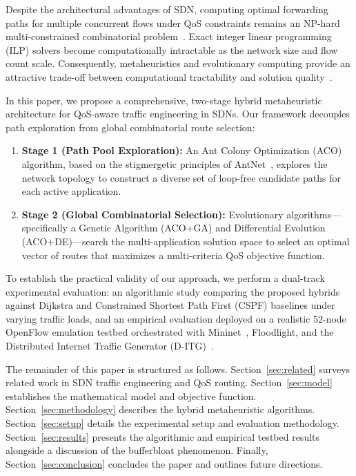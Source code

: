\documentclass[journal]{IEEEtran}
\begin{document}
Despite the architectural advantages of SDN, computing optimal forwarding paths for multiple concurrent flows under QoS constraints remains an NP-hard multi-constrained combinatorial problem~\cite{korkmaz2001multiconstrained, lin2022survey}. Exact integer linear programming (ILP) solvers become computationally intractable as the network size and flow count scale. Consequently, metaheuristics and evolutionary computing provide an attractive trade-off between computational tractability and solution quality~\cite{dorigo2004ant, goldberg1989genetic, storn1997differential, alsadi2021qos}.

In this paper, we propose a comprehensive, two-stage hybrid metaheuristic architecture for QoS-aware traffic engineering in SDNs. Our framework decouples path exploration from global combinatorial route selection:
\begin{enumerate}
    \item \textbf{Stage 1 (Path Pool Exploration):} An Ant Colony Optimization (ACO) algorithm, based on the stigmergetic principles of AntNet~\cite{dicaro1998antnet}, explores the network topology to construct a diverse set of loop-free candidate paths for each active application.
    \item \textbf{Stage 2 (Global Combinatorial Selection):} Evolutionary algorithms---specifically a Genetic Algorithm (ACO$+$GA) and Differential Evolution (ACO$+$DE)---search the multi-application solution space to select an optimal vector of routes that maximizes a multi-criteria QoS objective function.
\end{enumerate}

To establish the practical validity of our approach, we perform a dual-track experimental evaluation: an algorithmic study comparing the proposed hybrids against Dijkstra and Constrained Shortest Path First (CSPF) baselines under varying traffic loads, and an empirical evaluation deployed on a realistic 52-node OpenFlow emulation testbed orchestrated with Mininet~\cite{lantz2010network}, Floodlight, and the Distributed Internet Traffic Generator (D-ITG)~\cite{botta2012itg}.

The remainder of this paper is structured as follows. Section~\ref{sec:related} surveys related work in SDN traffic engineering and QoS routing. Section~\ref{sec:model} establishes the mathematical model and objective function. Section~\ref{sec:methodology} describes the hybrid metaheuristic algorithms. Section~\ref{sec:setup} details the experimental setup and evaluation methodology. Section~\ref{sec:results} presents the algorithmic and empirical testbed results alongside a discussion of the bufferbloat phenomenon. Finally, Section~\ref{sec:conclusion} concludes the paper and outlines future directions.
\end{document}
